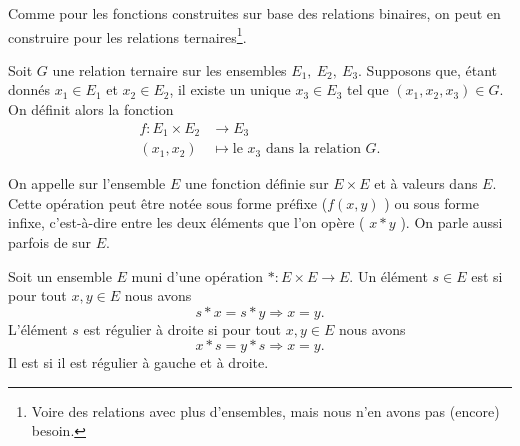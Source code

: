 \begin{normaltext}	\label{NORMooRelationsTernaires}
	Comme pour les fonctions construites sur base des relations binaires, on peut en construire pour les relations ternaires\footnote{Voire des relations avec plus d'ensembles, mais nous n'en avons pas (encore) besoin.}.
\end{normaltext}

\begin{normaltext}	\label{NORMooFonctionDeuxVariables}
  Soit \( G \) une relation ternaire sur les ensembles  \( E_1,\ E_2, \ E_3 \). Supposons que, étant donnés \(x_1 \in E_1 \) et \(x_2 \in E_2 \), il existe un unique \(x_3 \in E_3 \) tel que \( (x_1, x_2, x_3) \in G \). On définit alors la fonction
  \begin{equation}
    \begin{aligned}
        f\colon E_1 \times E_2 &\to E_3 \\
        (x_1, x_2) &\mapsto \text{le }x_3\text{ dans la relation }G.
    \end{aligned}
\end{equation}
\end{normaltext}

\begin{definition}  \label{DEFooOperation}
	On appelle  sur l'ensemble \( E \) une fonction définie sur \( E \times E \) et à valeurs dans  \( E \). Cette opération peut être notée sous forme préfixe (\( f(x, y) \) ) ou sous forme infixe, c'est-à-dire entre les deux éléments que l'on opère ( \( x * y \) ).
	On parle aussi parfois de  sur \( E \).
\end{definition}

\begin{definition}        \label{DEFooIJIEooZaAdSs}
	Soit un ensemble \( E\) muni d'une opération \( *\colon E\times E\to E\). Un élément \( s\in E\) est  si pour tout \( x,y\in E\) nous avons
	\begin{equation}
		s*x=s*y\Rightarrow x=y.
	\end{equation}
	L'élément \( s\) est régulier à droite si pour tout \( x,y\in E\) nous avons
	\begin{equation}
		x*s=y*s\Rightarrow x=y.
	\end{equation}
	Il est  si il est régulier à gauche et à droite.
\end{definition}


